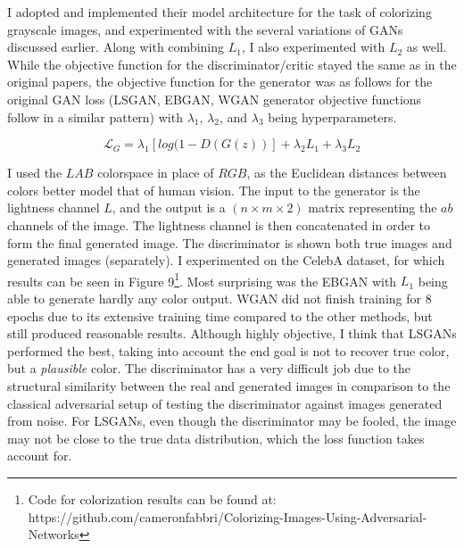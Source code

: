 \documentclass[9pt]{article}
\begin{document}
\noindent I adopted and implemented their model architecture for the task of colorizing grayscale images, and experimented with the several variations of GANs discussed earlier. Along with combining $L_1$, I also
experimented with $L_2$ as well. While the objective function for the discriminator/critic stayed the same as in the original papers, the objective function for the generator was as follows for the original GAN loss (LSGAN,
EBGAN, WGAN generator objective functions follow in a similar pattern) with $\lambda_1$, $\lambda_2$, and $\lambda_3$ being hyperparameters.

\[ \mathcal{L}_G = \lambda_1 [log(1-D(G(z))] + \lambda_2 L_1 + \lambda_3 L_2 \]

\noindent I used the $LAB$ colorspace in place of $RGB$, as the Euclidean distances between colors better model that of human vision. The input to the generator
is the lightness channel $L$,
and the output is a $(n \times m \times 2)$ matrix representing the $ab$ channels of the image. The lightness channel is then concatenated in order to form the final generated image. The discriminator is shown both
true images and generated images (separately). I experimented on the CelebA dataset, for which results can be seen in Figure 9\footnote{Code for colorization results can be found at:
https://github.com/cameronfabbri/Colorizing-Images-Using-Adversarial-Networks}. Most surprising was the EBGAN with $L_1$ being able to generate hardly any color output. 
WGAN did not finish training for 8 epochs due to its extensive training time compared to the other methods, but still produced reasonable results.
Although highly objective, I think that LSGANs performed the best, taking into account the end goal is not to recover true color, but a \textit{plausible} color. %
The discriminator has a very difficult job due to the structural similarity between the real and generated images in comparison to the classical adversarial setup of testing the discriminator against images generated from
noise. For LSGANs, even though the discriminator may be fooled, the image may not be close to the true data distribution, which the loss function takes account for. \newline
\end{document}
